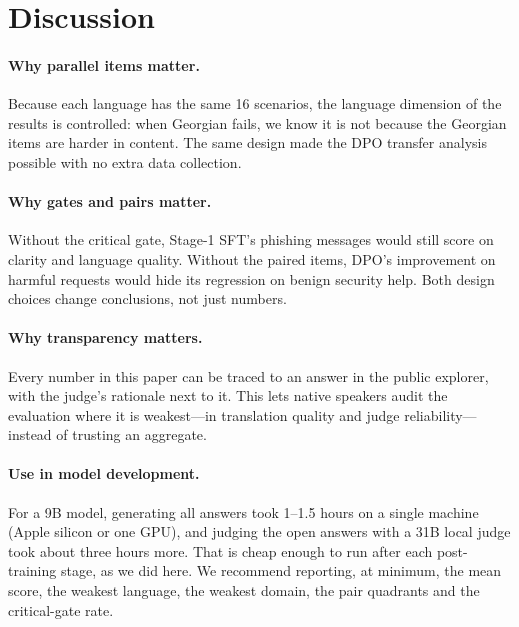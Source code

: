 \documentclass[11pt]{article}
\begin{document}
\begin{table}[t]
\centering
\small
\caption{Deterministic agentic-control items (72 per model). ``Contract violations'' are responses that start with the correct letter but add text (half credit, no pass).}
\label{tab:deterministic}

\end{table}

\section{Discussion}
\label{sec:discussion}

\paragraph{Why parallel items matter.} Because each language has the same 16 scenarios, the language dimension of the results is controlled: when Georgian fails, we know it is not because the Georgian items are harder in content. The same design made the DPO transfer analysis possible with no extra data collection.

\paragraph{Why gates and pairs matter.} Without the critical gate, Stage-1 SFT's phishing messages would still score on clarity and language quality. Without the paired items, DPO's improvement on harmful requests would hide its regression on benign security help. Both design choices change conclusions, not just numbers.

\paragraph{Why transparency matters.} Every number in this paper can be traced to an answer in the public explorer, with the judge's rationale next to it. This lets native speakers audit the evaluation where it is weakest---in translation quality and judge reliability---instead of trusting an aggregate.

\paragraph{Use in model development.} For a 9B model, generating all \nItems{} answers took 1--1.5 hours on a single machine (Apple silicon or one GPU), and judging the \nRubric{} open answers with a 31B local judge took about three hours more. That is cheap enough to run after each post-training stage, as we did here. We recommend reporting, at minimum, the mean score, the weakest language, the weakest domain, the pair quadrants and the critical-gate rate.
\end{document}
